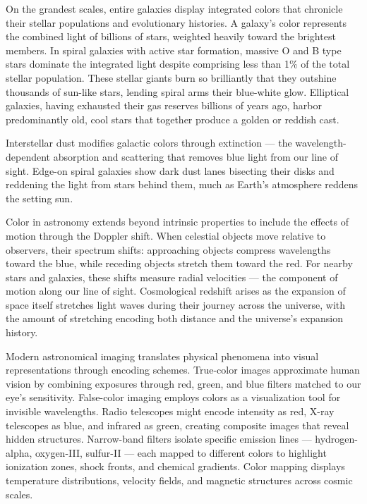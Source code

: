 On the grandest scales, entire galaxies display integrated colors that chronicle their stellar populations and evolutionary histories. A galaxy's color represents the combined light of billions of stars, weighted heavily toward the brightest members. In spiral galaxies with active star formation, massive O and B type stars dominate the integrated light despite comprising less than 1\% of the total stellar population. These stellar giants burn so brilliantly that they outshine thousands of sun-like stars, lending spiral arms their blue-white glow. Elliptical galaxies, having exhausted their gas reserves billions of years ago, harbor predominantly old, cool stars that together produce a golden or reddish cast.

Interstellar dust modifies galactic colors through extinction — the wavelength-dependent absorption and scattering that removes blue light from our line of sight. Edge-on spiral galaxies show dark dust lanes bisecting their disks and reddening the light from stars behind them, much as Earth's atmosphere reddens the setting sun.

Color in astronomy extends beyond intrinsic properties to include the effects of motion through the Doppler shift. When celestial objects move relative to observers, their spectrum shifts: approaching objects compress wavelengths toward the blue, while receding objects stretch them toward the red. For nearby stars and galaxies, these shifts measure radial velocities — the component of motion along our line of sight. Cosmological redshift arises as the expansion of space itself stretches light waves during their journey across the universe, with the amount of stretching encoding both distance and the universe's expansion history.

Modern astronomical imaging translates physical phenomena into visual representations through encoding schemes. True-color images approximate human vision by combining exposures through red, green, and blue filters matched to our eye's sensitivity. False-color imaging employs colors as a visualization tool for invisible wavelengths. Radio telescopes might encode intensity as red, X-ray telescopes as blue, and infrared as green, creating composite images that reveal hidden structures. Narrow-band filters isolate specific emission lines — hydrogen-alpha, oxygen-III, sulfur-II — each mapped to different colors to highlight ionization zones, shock fronts, and chemical gradients. Color mapping displays temperature distributions, velocity fields, and magnetic structures across cosmic scales.

